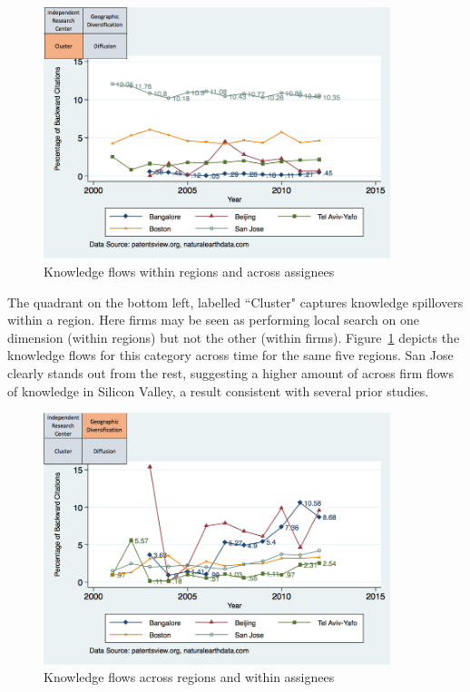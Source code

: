 \documentclass[12pt,letterpaper]{article}
\begin{document}
\begin{figure}[h!]
\begin{centering}
  \includegraphics[width=0.90\textwidth]{SMSSameRegionDiffAssigneeFlows}
  \caption{Knowledge flows within regions and across assignees}
  \label{fig:SMSSameRegionDiffAssigneeFlows}
\end{centering}
\end{figure}
The quadrant on the bottom left, labelled ``Cluster" captures knowledge spillovers within a region. Here firms may be seen as performing local search on one dimension (within regions) but not the other (within firms). Figure~\ref{fig:SMSSameRegionDiffAssigneeFlows} depicts the knowledge flows for this category across time for the same five regions. San Jose clearly stands out from the rest, suggesting a higher amount of across firm flows of knowledge in Silicon Valley, a result consistent with several prior studies. \par
\begin{figure}[h!]
\begin{centering}
  \includegraphics[width=0.90\textwidth]{SMSDiffRegionSameAssigneeFlows}
  \caption{Knowledge flows across regions and within assignees}
  \label{fig:SMSDiffRegionSameAssigneeFlows}
\end{centering}
\end{figure}
\end{document}
